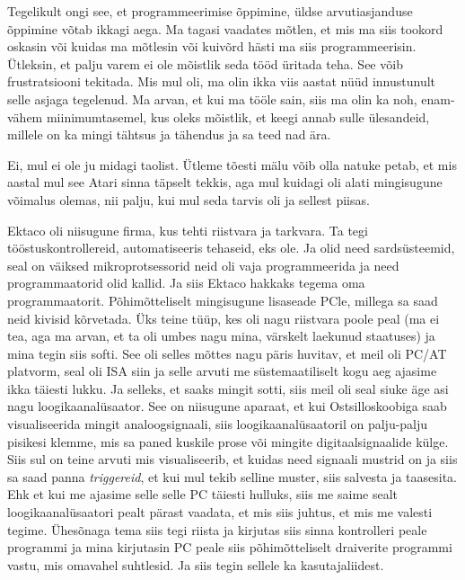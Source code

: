 
Tegelikult ongi see, et programmeerimise õppimine, üldse arvutiasjanduse 
õppimine võtab ikkagi aega. Ma tagasi vaadates mõtlen, et mis ma siis tookord 
oskasin või kuidas ma mõtlesin või  kuivõrd hästi ma siis programmeerisin.  
Ütleksin, et palju varem ei ole mõistlik seda tööd üritada teha. See võib  
frustratsiooni tekitada. Mis mul oli, ma olin ikka viis aastat nüüd innustunult 
selle asjaga tegelenud. Ma arvan, et kui ma  tööle sain, siis ma olin ka noh, 
enam-vähem miinimumtasemel, kus oleks  mõistlik, et keegi annab sulle 
ülesandeid, millele on ka mingi tähtsus ja tähendus ja sa teed nad  ära.


Ei, mul ei ole ju midagi taolist. Ütleme tõesti mälu võib olla natuke petab, et 
mis aastal mul see Atari sinna täpselt tekkis, aga mul kuidagi oli alati 
mingisugune võimalus olemas, nii palju, kui mul seda tarvis oli ja sellest 
piisas. 


Ektaco oli niisugune  firma, kus tehti riistvara ja tarkvara. Ta tegi 
tööstuskontrollereid, automatiseeris tehaseid, eks ole. Ja olid need 
sardsüsteemid, seal on väiksed mikroprotsessorid neid oli vaja programmeerida 
ja need programmaatorid olid kallid. Ja siis Ektaco hakkaks tegema oma 
programmaatorit. Põhimõtteliselt mingisugune lisaseade PCle, millega sa saad 
neid kivisid kõrvetada. Üks teine tüüp, kes oli nagu riistvara poole peal (ma 
ei tea, aga ma arvan, et ta oli umbes nagu mina, värskelt laekunud staatuses) 
ja mina tegin siis softi. See oli selles mõttes nagu päris huvitav, et meil oli 
PC/AT platvorm, seal oli ISA siin ja selle arvuti me süstemaatiliselt kogu aeg 
ajasime ikka täiesti lukku. Ja selleks, et saaks mingit sotti, siis meil oli 
seal siuke äge asi nagu loogikaanalüsaator. See on niisugune aparaat, et kui 
Ostsilloskoobiga saab visualiseerida mingit analoogsignaali, siis 
loogikaanalüsaatoril on palju-palju pisikesi klemme, mis sa paned kuskile prose 
või mingite digitaalsignaalide külge. Siis sul on teine arvuti mis  
visualiseerib, et kuidas need signaali mustrid on ja siis sa saad panna 
\emph{triggereid}, et kui mul tekib selline muster,  siis salvesta ja 
taasesita. Ehk et kui me ajasime selle selle PC täiesti hulluks, siis me saime 
sealt loogikaanalüsaatori pealt pärast vaadata, et mis siis juhtus, et mis me 
valesti tegime. Ühesõnaga tema siis tegi riista ja kirjutas siis sinna 
kontrolleri peale programmi ja mina kirjutasin PC peale siis põhimõtteliselt 
draiverite programmi vastu, mis omavahel suhtlesid. Ja siis tegin sellele ka 
kasutajaliidest.

